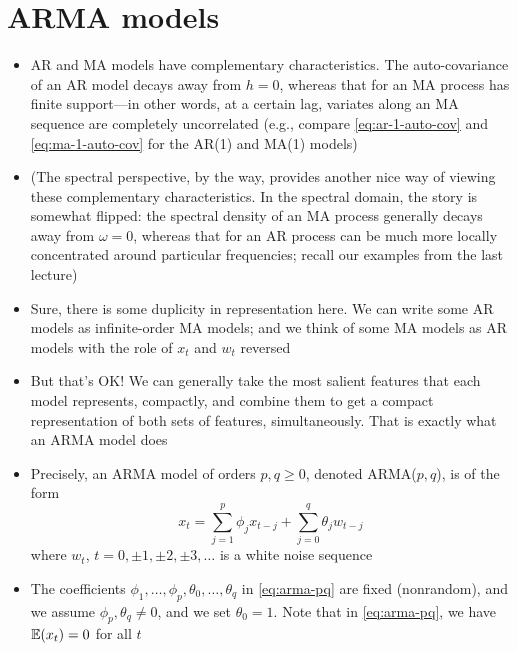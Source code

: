 \documentclass{article}
\begin{document}
\section{ARMA models}

\begin{itemize}
\item AR and MA models have complementary characteristics. The auto-covariance
  of an AR model decays away from $h=0$, whereas that for an MA process has
  finite support---in other words, at a certain lag, variates along an MA
  sequence are completely uncorrelated (e.g., compare \eqref{eq:ar-1-auto-cov}
  and \eqref{eq:ma-1-auto-cov} for the AR(1) and MA(1) models)   

\item (The spectral perspective, by the way, provides another nice way of
  viewing these complementary characteristics. In the spectral domain, the story
  is somewhat flipped: the spectral density of an MA process generally decays
  away from $\omega=0$, whereas that for an AR process can be much more locally
  concentrated around particular frequencies; recall our examples from the last
  lecture) 

\item Sure, there is some duplicity in representation here. We can write some AR
  models as infinite-order MA models; and we think of some MA models as AR
  models with the role of $x_t$ and $w_t$ reversed

\item But that's OK! We can generally take the most salient features that each
  model represents, compactly, and combine them to get a compact representation
  of both sets of features, simultaneously. That is exactly what an ARMA model
  does 

\item Precisely, an ARMA model of orders $p,q \geq 0$, denoted ARMA($p,q$), is
  of the form 
  \begin{equation}
    \label{eq:arma-pq}
  x_t = \sum_{j=1}^p \phi_j x_{t-j} + \sum_{j=0}^q \theta_j w_{t-j}  
  \end{equation}
  where $w_t$, $t = 0, \pm 1, \pm 2, \pm 3, \dots$ is a white noise sequence 

\item The coefficients $\phi_1,\dots,\phi_p,\theta_0,\dots,\theta_q$ in
  \eqref{eq:arma-pq} are fixed (nonrandom), and we assume $\phi_p,\theta_q \not=
  0$, and we set $\theta_0 = 1$. Note that in \eqref{eq:arma-pq}, we have
  $\mathbb{E}(x_t) = 0$ for all $t$ 


\end{itemize}
\end{document}
